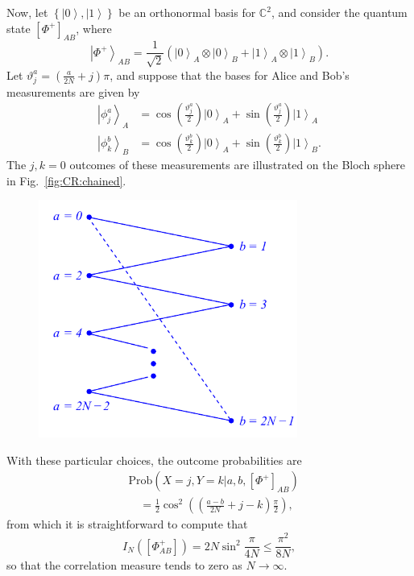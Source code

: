 \documentclass[DIV=calc,fontsize=12pt]{scrartcl} %
\theoremstyle{definition}
\theoremstyle{plain}
\newcommand{\Ket}[1]{\ensuremath{\left \vert #1 \right \rangle}}
\newcommand{\Proj}[1]{\ensuremath{\left [ #1 \right ]}}
\begin{document}
Now, let $\left \{ \Ket{0}, \Ket{1} \right \}$ be an orthonormal basis
for $\mathbb{C}^2$, and consider the quantum state
$\Proj{\Phi^+}_{AB}$, where
\begin{equation}
\Ket{\Phi^+}_{AB} = \frac{1}{\sqrt{2}} \left ( \Ket{0}_A \otimes \Ket{0}_B
+ \Ket{1}_A \otimes \Ket{1}_B \right ).
\end{equation}
Let $\vartheta^a_j = \left ( \frac{a}{2N} + j\right ) \pi$, and
suppose that the bases for Alice and Bob's measurements are given by
\begin{align}
\Ket{\phi^a_j}_A & = \cos \left ( \frac{\vartheta^a_j}{2} \right )
\Ket{0}_A + \sin \left ( \frac{\vartheta^a_j}{2} \right
) \Ket{1}_A \\
\Ket{\phi^b_k}_B & = \cos \left ( \frac{\vartheta^b_k}{2} \right )
\Ket{0}_A + \sin \left ( \frac{\vartheta^b_k}{2} \right ) \Ket{1}_B.
\end{align}
The $j,k=0$ outcomes of these measurements are illustrated on the
Bloch sphere in Fig.~\ref{fig:CR:chained}.
\begin{figure}[t!]
\centering
\includegraphics[width=85mm]{Fig14.pdf}
\caption{}
\end{figure}

With these particular choices, the outcome probabilities are
\begin{align}
&\text{Prob} \left ( X = j,Y = k|a,b,\Proj{\Phi^+}_{AB}\right ) \nonumber\\
&\quad= \frac{1}{2}
\cos^2 \left ( \left ( \frac{a-b}{2N} + j - k \right ) \frac{\pi}{2}
\right ),
\end{align}
from which it is straightforward to compute that
\begin{equation}
\label{eq:CR:corval}
I_N(\Proj{\Phi^+_{AB}}) = 2N \sin^2 \frac{\pi}{4N} \leq
\frac{\pi^2}{8N} ,
\end{equation}
so that the correlation measure tends to zero as $N \rightarrow
\infty$.
\end{document}
